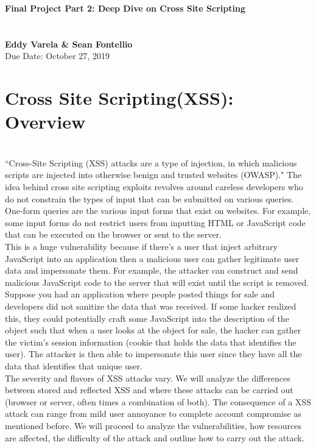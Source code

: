 \documentclass[11pt]{article}
\begin{document}

\noindent
\large\textbf{Final Project Part 2: Deep Dive on Cross Site Scripting} \\  
\normalsize 
\\ \\
\textbf{Eddy Varela \& Sean Fontellio} \\
\normalsize   Due Date: October 27, 2019
\\

\section*{Cross Site Scripting(XSS): Overview}\\

``Cross-Site Scripting (XSS) attacks are a type of injection, in which malicious scripts are injected into otherwise benign and trusted websites (OWASP)." The idea behind cross site scripting exploits revolves around careless developers who do not constrain the types of input that can be submitted on various queries. One-form queries are the various input forms that exist on websites. For example, some input forms do not restrict users from inputting HTML or JavaScript code that can be executed on the browser or sent to the server. \\ 

This is a huge vulnerability because if there's a user that inject arbitrary JavaScript into an application then a malicious user can gather legitimate user data and impersonate them. For example, the attacker can construct and send malicious JavaScript code to the server that will exist until the script is removed. Suppose you had an application where people posted things for sale and developers did not sanitize the data that was received. If some hacker realized this, they could potentially craft some JavaScript into the description of the object such that when a user looks at the object for sale, the hacker can gather the victim's session information (cookie that holds the data that identifies the user). The attacker is then able to impersonate this user since they have all the data that identifies that unique user.\\

The severity and flavors of XSS attacks vary. We will analyze the differences between stored and reflected XSS and where these attacks can be carried out (browser or server, often times a combination of both). The consequence of a XSS attack can range from mild user annoyance to complete account compromise as mentioned before. We will proceed to analyze the vulnerabilities, how resources are affected, the difficulty of the attack and outline how to carry out the attack.
\end{document}
